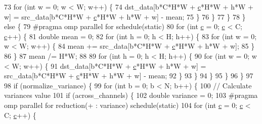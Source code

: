 \begin{DoxyCode}
73                         \textcolor{keywordflow}{for} (\textcolor{keywordtype}{int} w = 0; w < W; w++) \{
74                             dst\_data[b*C*H*W + \hyperlink{CMakeCache_8txt_aac1d6a1710812201527c735f7c6afbaa}{c}*H*W + h*W + w] = src\_data[b*C*H*W + 
      \hyperlink{CMakeCache_8txt_aac1d6a1710812201527c735f7c6afbaa}{c}*H*W + h*W + w] - mean;
75                         \}
76                     \}
77                 \}
78             \} \textcolor{keywordflow}{else} \{
79 \textcolor{preprocessor}{                #pragma omp parallel for schedule(static)}
80                 \textcolor{keywordflow}{for} (\textcolor{keywordtype}{int} \hyperlink{CMakeCache_8txt_aac1d6a1710812201527c735f7c6afbaa}{c} = 0; \hyperlink{CMakeCache_8txt_aac1d6a1710812201527c735f7c6afbaa}{c} < C; \hyperlink{CMakeCache_8txt_aac1d6a1710812201527c735f7c6afbaa}{c}++) \{
81                     \textcolor{keywordtype}{double} mean = 0;
82                     \textcolor{keywordflow}{for} (\textcolor{keywordtype}{int} h = 0; h < H; h++) \{
83                         \textcolor{keywordflow}{for} (\textcolor{keywordtype}{int} w = 0; w < W; w++) \{
84                             mean += src\_data[b*C*H*W + \hyperlink{CMakeCache_8txt_aac1d6a1710812201527c735f7c6afbaa}{c}*H*W + h*W + w];
85                         \}
86                     \}
87                     mean /= H*W;
88 
89                     \textcolor{keywordflow}{for} (\textcolor{keywordtype}{int} h = 0; h < H; h++) \{
90                         \textcolor{keywordflow}{for} (\textcolor{keywordtype}{int} w = 0; w < W; w++) \{
91                             dst\_data[b*C*H*W + \hyperlink{CMakeCache_8txt_aac1d6a1710812201527c735f7c6afbaa}{c}*H*W + h*W + w] = src\_data[b*C*H*W + 
      \hyperlink{CMakeCache_8txt_aac1d6a1710812201527c735f7c6afbaa}{c}*H*W + h*W + w] - mean;
92                         \}
93                     \}
94                 \}
95             \}
96         \}
97 
98         \textcolor{keywordflow}{if} (normalize\_variance) \{
99             \textcolor{keywordflow}{for} (\textcolor{keywordtype}{int} b = 0; b < N; b++) \{
100                 \textcolor{comment}{// Calculate variances value}
101                 \textcolor{keywordflow}{if} (across\_channels) \{
102                     \textcolor{keywordtype}{double} variance = 0;
103 \textcolor{preprocessor}{                    #pragma omp parallel for reduction(+ : variance) schedule(static)}
104                     \textcolor{keywordflow}{for} (\textcolor{keywordtype}{int} \hyperlink{CMakeCache_8txt_aac1d6a1710812201527c735f7c6afbaa}{c} = 0; \hyperlink{CMakeCache_8txt_aac1d6a1710812201527c735f7c6afbaa}{c} < C; \hyperlink{CMakeCache_8txt_aac1d6a1710812201527c735f7c6afbaa}{c}++) \{

\end{DoxyCode}
